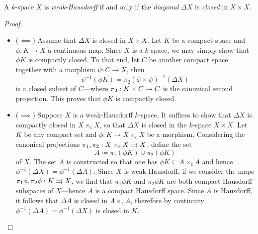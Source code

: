 \begin{proposition}
    \label{prop:k-space-is-weak-hausdorff-iff-diagonal-closed}
    A \(k\)-space \(X\) is \emph{weak-Hausdorff} if and only if the \emph{diagonal}
    \(\Delta X\) is \emph{closed} in \(X \times X\).
\end{proposition}

\begin{proof}
    \begin{itemize}\setlength\itemsep{0em}
        \item (\(\impliedby\)) Assume that \(\Delta X\) is closed in \(X \times X\). Let
              \(K\) be a compact space and \(\phi: K \to X\) a continuous map. Since \(X\)
              is a \(k\)-space, we may simply show that \(\phi K\) is compactly closed. To
              that end, let \(C\) be another compact space together with a morphism
              \(\psi: C \to X\), then
              \[
                  \psi^{-1}(\phi K) = \pi_2 (\phi \times \psi)^{-1}(\Delta X)
              \]
              is a closed subset of \(C\)---where \(\pi_2: K \times C \twoheadrightarrow C\) is the
              canonical second projection. This proves that \(\phi K\) is compactly closed.

        \item (\(\implies\)) Suppose \(X\) is a weak-Hausdorff \(k\)-space. It suffices
              to show that \(\Delta X\) is compactly closed in \(X \times_{\text{c}} X\), so
              that \(\Delta X\) is closed in the \(k\)-space \(X \times X\). Let \(K\) be
              any compact set and \(\phi: K \to X \times_{\text{c}} X\) be a
              morphism. Considering the canonical projections
              \(\pi_1, \pi_2: X \times_{\text{c}} X \rightrightarrows X\), define the set
              \[
                  A \coloneq \pi_1(\phi K) \cup \pi_2(\phi K)
              \]
              of \(X\). The set \(A\) is constructed so that one has
              \(\phi K \subseteq A \times_{\text{c}} A\) and hence
              \(\phi^{-1}(\Delta X) = \phi^{-1}(\Delta A)\). Since \(X\) is weak-Hausdorff,
              if we consider the maps \(\pi_1 \phi, \pi_2 \phi: K \rightrightarrows X\), we find that
              \(\pi_1\phi K\) and \(\pi_2 \phi K\) are both compact Hausdorff subspaces of
              \(X\)---hence \(A\) is a compact Hausdorff space. Since \(A\) is Hausdorff, it
              follows that \(\Delta A\) is closed in \(A \times_{\text{c}} A\), therefore by
              continuity \(\phi^{-1}(\Delta A) = \phi^{-1}(\Delta X)\) is closed in \(K\).
    \end{itemize}
\end{proof}

